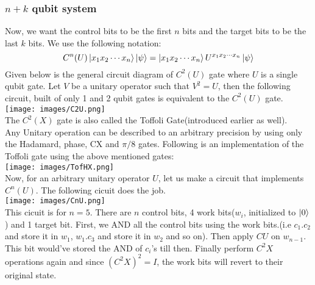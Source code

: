 \documentclass{article}
\begin{document}
\subsubsection{$n+k$ qubit system}
Now, we want the control bits to be the first $n$ bits and the target bits to be the last $k$ bits. We use the following notation:
$$C^n(U)\ket{x_1x_2 \cdots x_n}\ket{\psi} = \ket{x_1x_2 \cdots x_n}U^{x_1x_2 \cdots x_n}\ket{\psi}$$
Given below is the general circuit diagram of $C^2(U)$ gate where $U$ is a single qubit gate. Let $V$ be a unitary operator such that $V^2 = U$, then the following circuit, built of only 1 and 2 qubit gates is equivalent to the $C^2(U)$ gate.\\
\texttt{[image: images/C2U.png]}\\
The $C^2(X)$ gate is also called the Toffoli Gate(introduced earlier as well). \\
Any Unitary operation can be described to an arbitrary precision by using only the Hadamard, phase, CX and $\pi /8$ gates. Following is an implementation of the Toffoli gate using the above mentioned gates:\\
\texttt{[image: images/TofHX.png]}\\[3pt]
Now, for an arbitrary unitary operator $U$, let us make a circuit that implements $C^n(U)$. The following cicuit does the job.\\
\texttt{[image: images/CnU.png]}\\
This cicuit is for $n=5$. There are $n$ control bits, 4 work bits($w_i$, initialized to $\ket{0}$) and 1 target bit. First, we AND all the control bits using the work bits.(i.e $c_1.c_2$ and store it in $w_1$, $w_1.c_3$ and store it in $w_2$ and so on). Then apply $CU$ on $w_{n-1}$. This bit would've stored the AND of $c_i$'s till then. Finally perform $C^2X$ operations again and since $(C^2X)^2 = I$, the work bits will revert to their original state.
\end{document}
